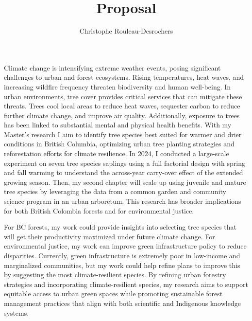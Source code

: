 \documentclass[11pt,letter]{article}
\title{Proposal}
\author{Christophe Rouleau-Desrochers}
\begin{document}

\maketitle

Climate change is intensifying extreme weather events, posing significant challenges to urban and forest ecosystems. Rising temperatures, heat waves, and increasing wildfire frequency threaten biodiversity and human well-being. In urban environments, tree cover provides critical services that can mitigate these threats. Trees cool local areas to reduce heat waves, sequester carbon to reduce further climate change, and improve air quality. Additionally, exposure to trees has been linked to substantial mental and physical health benefits. With my Master's research I aim to identify tree species best suited for warmer and drier conditions in British Columbia, optimizing urban tree planting strategies and reforestation efforts for climate resilience.
In 2024, I conducted a large-scale experiment on seven tree species saplings using a full factorial design with spring and fall warming to understand the across-year carry-over effect of the extended growing season. Then, my second chapter will scale up using juvenile and mature tree species by leveraging the data from a common garden and community science program in an urban arboretum.
This research has broader implications for both British Colombia forests and for environmental justice. 


For BC forests, my work could provide insights into selecting tree species that will get their productivity maximized under future climate change. For environmental justice, my work can improve green infrastructure policy to reduce disparities. Currently, green infrastructure is extremely poor in low-income and marginalized communities, but my work could help refine plans to improve this by suggesting the most climate-resilient species. By refining urban forestry strategies and incorporating climate-resilient species, my research aims to support equitable access to urban green spaces while promoting sustainable forest management practices that align with both scientific and Indigenous knowledge systems.
\end{document}

